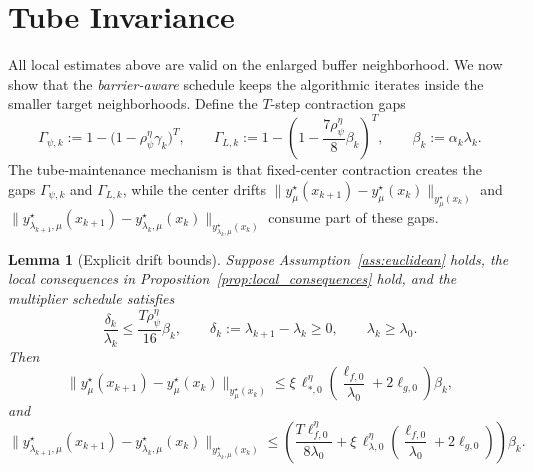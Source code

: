 \documentclass{article}
\newtheorem{lemma}{Lemma}
\begin{document}
\section{Tube Invariance}
\label{app:tube_invariance}

All local estimates above are valid on the enlarged buffer neighborhood. We now show that the
\textit{barrier-aware} schedule keeps the algorithmic iterates inside the smaller target neighborhoods. Define the
\(T\)-step contraction gaps
\begin{equation}
\label{eq:tube_contraction_gaps}
\Gamma_{\psi,k}
:=
1-\bigl(1-\rho_\psi^\eta\gamma_k\bigr)^T,
\qquad
\Gamma_{L,k}
:=
1-\left(1-\frac{7\rho_\psi^\eta}{8}\beta_k\right)^T,
\qquad
\beta_k:=\alpha_k\lambda_k .
\end{equation}
The tube-maintenance mechanism is that fixed-center contraction creates the gaps
\(\Gamma_{\psi,k}\) and \(\Gamma_{L,k}\), while the center drifts
\(\|y_\mu^\star(x_{k+1})-y_\mu^\star(x_k)\|_{y_\mu^\star(x_k)}\) and \(\|y_{\lambda_{k+1},\mu}^\star(x_{k+1})
-y_{\lambda_k,\mu}^\star(x_k)\|_{y_{\lambda_k,\mu}^\star(x_k)}\) consume part of these gaps.

\begin{lemma}[Explicit drift bounds]
\label{lem:tube_drift_explicit}
Suppose Assumption~\ref{ass:euclidean} holds, the local consequences in
Proposition~\ref{prop:local_consequences} hold, and the multiplier schedule satisfies
\[
\frac{\delta_k}{\lambda_k}
\le
\frac{T\rho_\psi^\eta}{16}\beta_k,
\qquad
\delta_k:=\lambda_{k+1}-\lambda_k\ge0,
\qquad
\lambda_k\ge\lambda_0 .
\]
Then
\begin{equation}
\label{eq:exact_drift_explicit}
\|y_\mu^\star(x_{k+1})-y_\mu^\star(x_k)\|_{y_\mu^\star(x_k)}
\le
\xi\,\ell_{*,0}^{\eta}
\left(\frac{\ell_{f,0}}{\lambda_0}+2\ell_{g,0}\right)\beta_k ,
\end{equation}
and
\begin{equation}
\label{eq:proxy_drift_explicit}
\|y_{\lambda_{k+1},\mu}^\star(x_{k+1})
-y_{\lambda_k,\mu}^\star(x_k)\|_{y_{\lambda_k,\mu}^\star(x_k)}
\le
\left(
\frac{T\ell_{f,0}^{\eta}}{8\lambda_0}
+
\xi\,\ell_{\lambda,0}^{\eta}
\left(\frac{\ell_{f,0}}{\lambda_0}+2\ell_{g,0}\right)
\right)\beta_k .
\end{equation}
\end{lemma}
\end{document}
